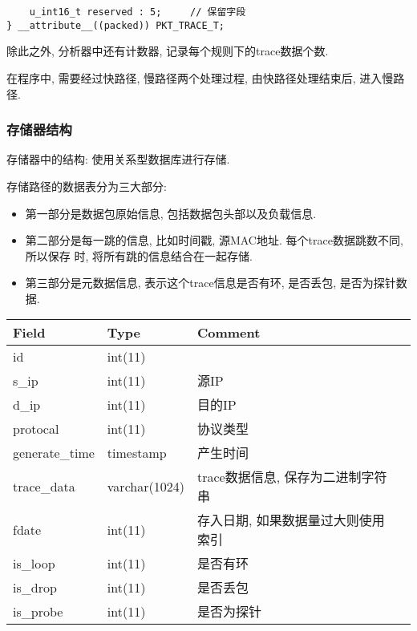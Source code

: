 {\begin{mdframed}[everyline=true]
\begin{lstlisting}
    u_int16_t reserved : 5;     // 保留字段
} __attribute__((packed)) PKT_TRACE_T;
\end{lstlisting}

除此之外, 分析器中还有计数器, 记录每个规则下的trace数据个数.

在程序中, 需要经过快路径, 慢路径两个处理过程, 由快路径处理结束后, 进入慢路径.


\subsubsection{存储器结构}

存储器中的结构: 使用关系型数据库进行存储.

存储路径的数据表分为三大部分:

\begin{itemize}
    \setlength\itemsep{0.1em}
    \item 第一部分是数据包原始信息, 包括数据包头部以及负载信息.
    \item 第二部分是每一跳的信息, 比如时间戳, 源MAC地址. 每个trace数据跳数不同,
            所以保存 时, 将所有跳的信息结合在一起存储.
    \item 第三部分是元数据信息, 表示这个trace信息是否有环, 是否丢包,
            是否为探针数据.
\end{itemize}


\begin{center}
    \begin{tabular}{llll}   \hline
    Field          & Type          & Comment                   \\ \hline
    id             & int(11)       &                           \\
    s\_ip          & int(11)       & 源IP                       \\
    d\_ip          & int(11)       & 目的IP                      \\
    protocal       & int(11)       & 协议类型                      \\
    generate\_time & timestamp     & 产生时间                      \\
    trace\_data    & varchar(1024) & trace数据信息, 保存为二进制字符串    \\
    fdate          & int(11)       & 存入日期, 如果数据量过大则使用索引 \\
    is\_loop       & int(11)       & 是否有环                      \\
    is\_drop       & int(11)       & 是否丢包                      \\
    is\_probe      & int(11)       & 是否为探针                    \\ \hline
    \end{tabular}
    \label{tbl_traffic_data}
\end{center}


\end{mdframed}}
